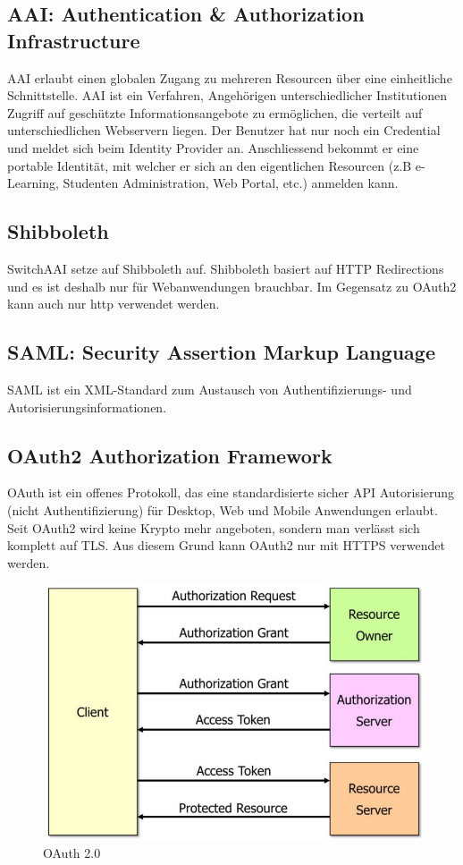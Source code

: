 \subsection{AAI: Authentication \& Authorization Infrastructure}
AAI erlaubt einen globalen Zugang zu mehreren Resourcen über eine einheitliche Schnittstelle. AAI ist ein Verfahren, Angehörigen unterschiedlicher Institutionen Zugriff auf geschützte Informationsangebote zu ermöglichen, die verteilt auf unterschiedlichen Webservern liegen. Der Benutzer hat nur noch ein Credential und meldet sich beim Identity Provider an. Anschliessend bekommt er eine portable Identität, mit welcher er sich an den eigentlichen Resourcen (z.B e-Learning, Studenten Administration, Web Portal, etc.) anmelden kann.

\subsection{Shibboleth}
SwitchAAI setze auf Shibboleth auf. Shibboleth basiert auf HTTP Redirections und es ist deshalb nur für Webanwendungen brauchbar. Im Gegensatz zu OAuth2 kann auch nur http verwendet werden.

\subsection{SAML: Security Assertion Markup Language}
SAML ist ein XML-Standard zum Austausch von Authentifizierungs- und Autorisierungsinformationen. 

\subsection{OAuth2 Authorization Framework}
OAuth ist ein offenes Protokoll, das eine standardisierte sicher API Autorisierung (nicht Authentifizierung) für Desktop, Web und Mobile Anwendungen erlaubt. Seit OAuth2 wird keine Krypto mehr angeboten, sondern man verlässt sich komplett auf TLS. Aus diesem Grund kann OAuth2 nur mit HTTPS verwendet werden.
\begin{figure}[h!]
	\centering
	\includegraphics[width=0.4\linewidth]{images/oauth2}
	\caption{OAuth 2.0}
	\label{fig:oauth2}
\end{figure}


